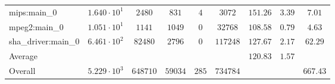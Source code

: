 \begin{tabular}{|l|c|c|c|c|c|c|c|c|}
mips:main\_0            & $ 1.640 \cdot 10^{1}  $ & $ 2480   $ & $ 831   $ & $ 4   $ & $ 3072   $ & $ 151.26      $ & $ 3.39    $ & $ 7.01    $ \\
mpeg2:main\_0           & $ 1.051 \cdot 10^{1}  $ & $ 1141   $ & $ 1049  $ & $ 0   $ & $ 32768  $ & $ 108.58      $ & $ 0.79    $ & $ 4.63    $ \\
sha\_driver:main\_0     & $ 6.461 \cdot 10^{2}  $ & $ 82480  $ & $ 2796  $ & $ 0   $ & $ 117248 $ & $ 127.67      $ & $ 2.17    $ & $ 62.29   $ \\
\hline
Average                 & $                     $ & $        $ & $       $ & $     $ & $        $ & $ 120.83      $ & $ 1.57    $ & $         $ \\
\hline
Overall                 & $ 5.229 \cdot 10^{3}  $ & $ 648710 $ & $ 59034 $ & $ 285 $ & $ 734784 $ & $             $ & $         $ & $ 667.43  $ \\
\hline
\end{tabular}
